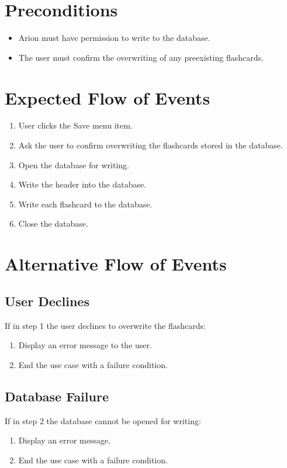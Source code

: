 \documentclass{scrreprt}
\begin{document}
\section{Preconditions}
\begin{itemize}
    \item Arion must have permission to write to the database.
    \item The user must confirm the overwriting of any preexisting flashcards.
\end{itemize}

\section{Expected Flow of Events}
\begin{enumerate}[1.]
    \item User clicks the Save menu item.
    \item Ask the user to confirm overwriting the flashcards stored in the database.
    \item Open the database for writing.
    \item Write the header into the database.
    \item Write each flashcard to the database.
    \item Close the database.
\end{enumerate}

\section{Alternative Flow of Events}

    \subsection{User Declines}
    If in step 1 the user declines to overwrite the flashcards:
    \begin{enumerate}
        \item Display an error message to the user.
        \item End the use case with a failure condition.
    \end{enumerate}

    \subsection{Database Failure}
    If in step 2 the database cannot be opened for writing:
    \begin{enumerate}[1.]
        \item Display an error message.
        \item End the use case with a failure condition.
    \end{enumerate}
\end{document}

